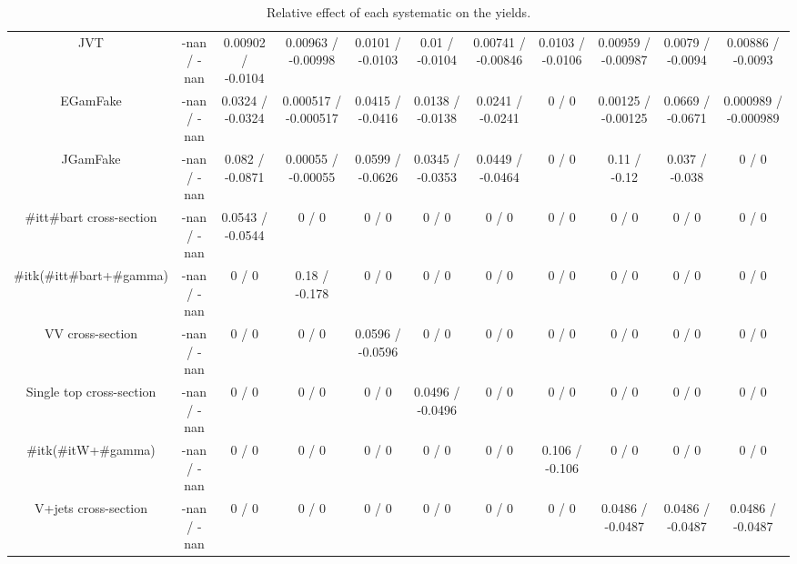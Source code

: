\begin{table}[htbp]
\begin{center}
\begin{tabular}{|c|c|c|c|c|c|c|c|c|c|c|}
  JVT & -nan / -nan & 0.00902 / -0.0104 & 0.00963 / -0.00998 & 0.0101 / -0.0103 & 0.01 / -0.0104 & 0.00741 / -0.00846 & 0.0103 / -0.0106 & 0.00959 / -0.00987 & 0.0079 / -0.0094 & 0.00886 / -0.0093 \\ 
  EGamFake & -nan / -nan & 0.0324 / -0.0324 & 0.000517 / -0.000517 & 0.0415 / -0.0416 & 0.0138 / -0.0138 & 0.0241 / -0.0241 & 0 / 0 & 0.00125 / -0.00125 & 0.0669 / -0.0671 & 0.000989 / -0.000989 \\ 
  JGamFake & -nan / -nan & 0.082 / -0.0871 & 0.00055 / -0.00055 & 0.0599 / -0.0626 & 0.0345 / -0.0353 & 0.0449 / -0.0464 & 0 / 0 & 0.11 / -0.12 & 0.037 / -0.038 & 0 / 0 \\ 
  #it{t#bar{t}} cross-section & -nan / -nan & 0.0543 / -0.0544 & 0 / 0 & 0 / 0 & 0 / 0 & 0 / 0 & 0 / 0 & 0 / 0 & 0 / 0 & 0 / 0 \\ 
  #it{k}(#it{t#bar{t}+#gamma}) & -nan / -nan & 0 / 0 & 0.18 / -0.178 & 0 / 0 & 0 / 0 & 0 / 0 & 0 / 0 & 0 / 0 & 0 / 0 & 0 / 0 \\ 
  VV cross-section & -nan / -nan & 0 / 0 & 0 / 0 & 0.0596 / -0.0596 & 0 / 0 & 0 / 0 & 0 / 0 & 0 / 0 & 0 / 0 & 0 / 0 \\ 
  Single top cross-section & -nan / -nan & 0 / 0 & 0 / 0 & 0 / 0 & 0.0496 / -0.0496 & 0 / 0 & 0 / 0 & 0 / 0 & 0 / 0 & 0 / 0 \\ 
  #it{k}(#it{W+#gamma}) & -nan / -nan & 0 / 0 & 0 / 0 & 0 / 0 & 0 / 0 & 0 / 0 & 0.106 / -0.106 & 0 / 0 & 0 / 0 & 0 / 0 \\ 
  V+jets cross-section & -nan / -nan & 0 / 0 & 0 / 0 & 0 / 0 & 0 / 0 & 0 / 0 & 0 / 0 & 0.0486 / -0.0487 & 0.0486 / -0.0487 & 0.0486 / -0.0487 \\ 
\hline 
\end{tabular} 
\caption{Relative effect of each systematic on the yields.} 
\end{center} 
\end{table} 
